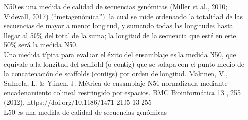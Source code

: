 
N50 es una medida de calidad de secuencias genómicas (Miller et al., 2010; Videvall, 2017) (“metagenómica”), la cual se mide ordenando la totalidad de las secuencias de mayor a menor longitud, y sumando todas las longitudes hasta llegar al 50\% del total de la suma; la longitud de la secuencia que esté en este 50\% será la medida N50.  \\

Una medida típica para evaluar el éxito del ensamblaje es la medida N50, que equivale a la longitud del scaﬀold (o contig) que se solapa con el punto medio de la concatenación de scaﬀolds (contigs) por orden de longitud. Mäkinen, V., Salmela, L. \& Ylinen, J. Métrica de ensamblaje N50 normalizada mediante encadenamiento colineal restringido por espacios. BMC Bioinformática 13 , 255 (2012). https://doi.org/10.1186/1471-2105-13-255   \\

L50 es una medida de calidad de secuencias genómicas\\
